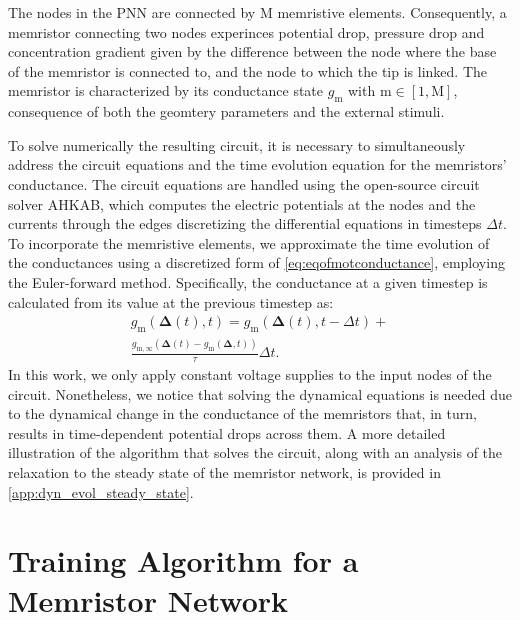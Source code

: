 \documentclass[reprint,superscriptaddress,prb,showkeys]{revtex4-2}
\newcommand{\m}{\text{m}} %
\newcommand{\M}{\text{M}} %
\newcommand{\brac}[1]{\left(#1 \right)} %
\begin{document}
The nodes in the PNN are connected by $\M$ memristive elements. Consequently, a memristor connecting two nodes experinces potential drop, pressure drop and concentration gradient given by the difference between the node where the base of the memristor is connected to, and the node to which the tip is linked. The memristor is characterized by its conductance state $g_{\m}$ with $\m\in[1,\M]$, consequence of both the geomtery parameters and the external stimuli.

To solve numerically the resulting circuit, it is necessary to simultaneously address the circuit equations and the time evolution equation for the memristors' conductance. 
The circuit equations are handled using the open-source circuit solver \textsc{AHKAB}\cite{}, which computes the electric potentials at the nodes and the currents through the edges discretizing the differential equations in timesteps $\Delta t$. To incorporate the memristive elements, we approximate the time evolution of the conductances using a discretized form of \cref{eq:eqofmotconductance}, employing the Euler-forward method. Specifically, the conductance at a given timestep is calculated from its value at the previous timestep as:
\begin{multline}
g_{\m}\brac{\boldsymbol{\Delta}(t), t} = g_{\m}\brac{\boldsymbol{\Delta}(t), t-\Delta t} + \\
 \frac{g_{\m,\infty}\brac{\boldsymbol{\Delta}(t)-g_{\m}\brac{\boldsymbol{\Delta}, t}}}{\tau}\Delta t.
\end{multline}
In this work, we only apply constant voltage supplies to the input nodes of the circuit. Nonetheless, we notice that solving the dynamical equations is needed due to the dynamical change in the conductance of the memristors that, in turn, results in time-dependent potential drops across them. A more detailed illustration of the algorithm that solves the circuit, along with an analysis of the relaxation to the steady state of the memristor network, is provided in \cref{app:dyn_evol_steady_state}.

\section{\label{sec:training}Training Algorithm for a Memristor Network}
\end{document}
